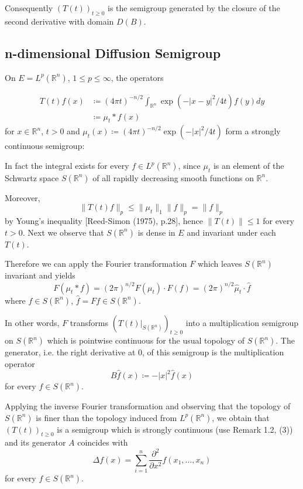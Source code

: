 Consequently $(T(t))_{t \geq 0}$ is the semigroup generated by the closure of the second derivative with domain $D(B)$.

\subsection{n-dimensional Diffusion Semigroup}\label{subsec:a1-2.8}
On $E = L^{p}(\mathbb{R}^{n})$, $1 \leq p \leq \infty$, the operators

\begin{align*}
    T(t)f(x) &\coloneqq (4\pi t)^{-n/2} \int_{\mathbb{R}^{n}} \exp(-|x-y|^{2}/4t)f(y)dy \\
    &\coloneqq \mu_{t}*f(x)
\end{align*}
for $x \in \mathbb{R}^{n}$, $t > 0$ and $\mu_{t}(x) \coloneqq (4\pi t)^{-n/2} \exp(-|x|^{2}/4t)$ form a strongly continuous semigroup:

In fact the integral exists for every $f \in L^{p}(\mathbb{R}^{n})$, since $\mu_{t}$ is an element of the Schwartz space $S(\mathbb{R}^{n})$ of all rapidly decreasing smooth functions on $\mathbb{R}^{n}$.

Moreover,
\[
    \|T(t)f\|_{p} \leq \|\mu_{t}\|_{1}\|f\|_{p} = \|f\|_{p}
\]
by Young's inequality [Reed-Simon (1975), p.28], hence $\|T(t)\| \leq 1$ for every $t > 0$.
Next we observe that $S(\mathbb{R}^{n})$ is dense in $E$ and invariant under each $T(t)$.


\newpage
Therefore we can apply the Fourier transformation $F$ which leaves $S(\mathbb{R}^{n})$ invariant and yields
\[
    F(\mu_{t}*f) = (2\pi)^{n/2} F(\mu_{t}) \cdot F(f) = (2\pi)^{n/2} \hat{\mu}_{t}\cdot\hat{f}
\]
where $f \in S(\mathbb{R}^{n})$, $\hat{f} = Ff \in S(\mathbb{R}^{n})$.

In other words, $F$ transforms $(T(t)|_{S(\mathbb{R}^{n})})_{t \geq 0}$ into a multiplication semigroup on $S(\mathbb{R}^{n})$ which is pointwise continuous for the usual topology of $S(\mathbb{R}^{n})$.
The generator, i.e. the right derivative at $0$, of this semigroup is the multiplication operator
\[
    B\hat{f}(x) \coloneqq -|x|^{2}\hat{f}(x)
\]
for every $f \in S(\mathbb{R}^{n})$.

Applying the inverse Fourier transformation and observing that the topology of $S(\mathbb{R}^{n})$ is finer than the topology induced from $L^{p}(\mathbb{R}^{n})$, we obtain that $(T(t))_{t \geq 0}$ is a semigroup which is strongly continuous (use Remark 1.2, (3)) and its generator $A$ coincides with
\[
    \Delta f(x) = \sum_{i=1}^{n} \frac{\partial^{2}}{\partial x^{2}} f(x_{1},\ldots,x_{n})
\]
for every $f \in S(\mathbb{R}^{n})$.

